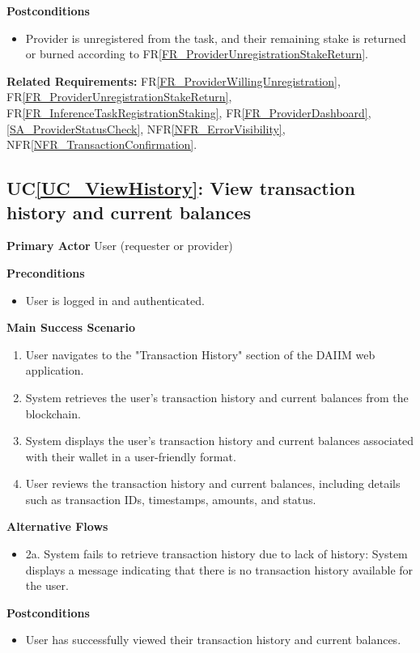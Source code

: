 \documentclass[12pt]{article}
\newcounter{ucnum} %
\newcommand{\ucref}[1]{UC\ref{#1}}
\newcommand{\rref}[1]{FR\ref{#1}}
\newcommand{\nfrref}[1]{NFR\ref{#1}}
\begin{document}
\textbf{Postconditions}
\begin{itemize}
\item Provider is unregistered from the task, and their remaining stake is returned or burned according to \rref{FR_ProviderUnregistrationStakeReturn}.
\end{itemize}

\textbf{Related Requirements:} \rref{FR_ProviderWillingUnregistration}, \rref{FR_ProviderUnregistrationStakeReturn}, \rref{FR_InferenceTaskRegistrationStaking}, \rref{FR_ProviderDashboard}, \ref{SA_ProviderStatusCheck}, \nfrref{NFR_ErrorVisibility}, \nfrref{NFR_TransactionConfirmation}.

 \label{UC_ViewHistory}
\subsection{\ucref{UC_ViewHistory}: View transaction history and current balances}

\textbf{Primary Actor}
User (requester or provider)

\textbf{Preconditions}
\begin{itemize}
\item User is logged in and authenticated.
\end{itemize}

\textbf{Main Success Scenario}
\begin{enumerate}
\item User navigates to the "Transaction History" section of the DAIIM web application.
\item System retrieves the user's transaction history and current balances from the blockchain.
\item System displays the user's transaction history and current balances associated with their wallet in a user-friendly format.
\item User reviews the transaction history and current balances, including details such as transaction IDs, timestamps, amounts, and status.
\end{enumerate}

\textbf{Alternative Flows}
\begin{itemize}
\item 2a. System fails to retrieve transaction history due to lack of history: System displays a message indicating that there is no transaction history available for the user.
\end{itemize}

\textbf{Postconditions}
\begin{itemize}
\item User has successfully viewed their transaction history and current balances.
\end{itemize}
\end{document}
